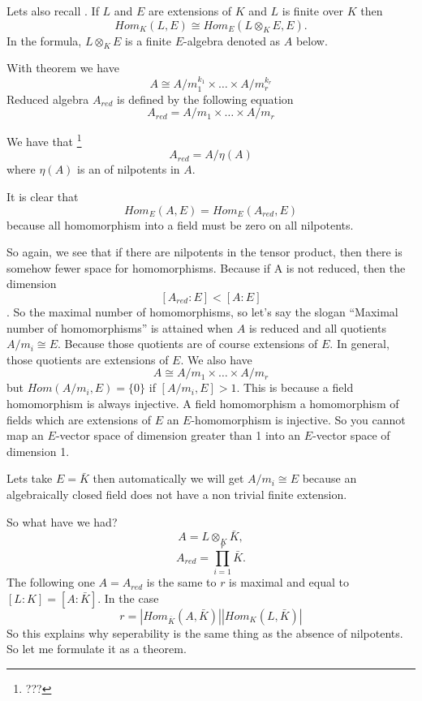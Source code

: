 Lets also recall . If $L$ and $E$ are
extensions of $K$ and $L$ is finite over $K$ then
\[
Hom_K\left(L, E\right) \cong
Hom_E\left(
L \otimes_K E, E
\right).
\]
In the formula, $L \otimes_K E$ is a finite $E$-algebra denoted as $A$
below.

\begin{definition}
  With  theorem we have
  \[
  A \cong A/m_1^{k_1} \times \dots \times A/m_r^{k_r}
  \]
  Reduced algebra $A_{red}$ is defined by the following equation
  \[
  A_{red} = A/m_1 \times \dots \times A/m_r
  \]
  \label{def:reducedalgebra}
\end{definition}

We have that
\footnote{
  ???
}
\[
A_{red} = A /\eta\left(A\right)
\]
where $\eta\left(A\right)$ is an  of
nilpotents in $A$.

It is clear that
\[
Hom_E\left(A, E\right) =
Hom_E\left(A_{red}, E\right)
\]
because all homomorphism into a field must be zero on all nilpotents. 

So again, we see that if there are nilpotents in the tensor product,
then there is somehow fewer space for homomorphisms. Because if A is
not reduced, then the dimension
\[
\left[A_{red} : E\right] < \left[A : E\right]
\].  
So the maximal number of homomorphisms, so let's say the slogan
``Maximal number of homomorphisms'' is attained when $A$ is reduced
and all quotients $A/m_i \cong E$.
Because those quotients are of course extensions of $E$. In general,   
those quotients are extensions of $E$. We also have
\[
A \cong A/m_1 \times \dots \times A/m_r
\]
but $Hom\left(A/m_i, E\right) = \{0\}$ if $\left[A/m_i, E\right] > 1$.  
This is because a field homomorphism is always injective. A field
homomorphism a homomorphism of fields which are extensions of $E$  an
$E$-homomorphism is injective. So you cannot map an $E$-vector space of
dimension greater than 1 into an $E$-vector space of dimension 1.

Lets take $E = \bar{K}$ then automatically we will get
$A/m_i \cong E$ because an algebraically closed field does not have a
non trivial finite extension.

So what have we had?
\[
A = L \otimes_K \bar{K},
\]
\[
A_{red} = \prod_{i=1}^r \bar{K}.
\]
The following one $A = A_{red}$ is the same to $r$ is maximal and
equal to $\left[L:K\right] = \left[A: \bar{K}\right]$. In the case
\[
r = \left|Hom_{\bar{K}}\left(A, \bar{K}\right)\right|
\left|Hom_K\left(L, \bar{K}\right)\right|
\]
So this explains why seperability is the same thing as the absence of
nilpotents. So let me formulate it as a theorem.


